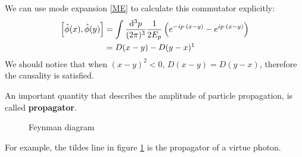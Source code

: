 \documentclass[12pt]{article}
\numberwithin{equation}{section}
\theoremstyle{1style}
\newcommand{\tbf}[1]{\textbf{#1}}
\newcommand{\id}{\mathrm{d}}
\begin{document}
We can use mode expansion \ref{ME} to calculate this commutator explicitly:
\begin{align}
  \left[\hat{\phi}(x),\hat{\phi}(y)\right] & =\int \frac{\id^3p}{(2\pi)^3}\frac{1}{2E_{p}}
  \left(e^{-ip\cdot(x-y)}-e^{ip\cdot(x-y)}\right)                                          \\
                                           & =D(x-y)-D(y-x) \footnotemark
\end{align}
We should notice that when \((x-y)^2<0\), \(D(x-y)=D(y-x)\), therefore the causality is satisfied.

An important quantity that describes the amplitude of particle propagation, is called \tbf{propagator}.
\begin{figure}[ht]
  \centering
{}
\caption{Feynman diagram}\label{PE}
\end{figure}
For example, the tildes line in figure \ref{PE} is the propagator of a virtue photon.
\end{document}
